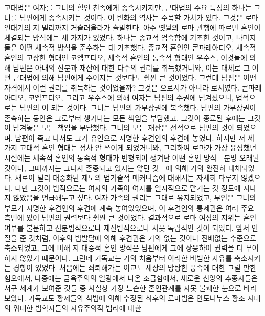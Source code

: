 고대법은 여자를 그녀의 혈연 친족에게 종속시키지만,
근대법의 주요 특징의 하나는 그녀를 남편에게 종속시키는 것이다.
이 변화의 역사는 주목할 가치가 있다.
그것은 로마 연대기의 저 멀리까지 거슬러올라가 출발한다.
아주 옛날의 로마 관행에 따르면
혼인이 체결되는
방식에는
세 가지가
있었다.
하나는 종교적 엄숙함에 기초한 것이고,
나머지 둘은 어떤 세속적 방식을 준수하는 데 기초했다.
종교적 혼인인 콘파레아티오,
세속적 혼인의 고상한 형태인 코엠프티오,
세속적 혼인의 통속적 형태인 우수스,
이것들에 의해 남편은 아내의 신분과 재산에 대한 다수의 권리를 취득했거니와,
이는 대체로 그 어떤 근대법에 의해 남편에게 주어지는 것보다도 훨씬 큰 것이었다.
그런데 남편은 어떤 자격에서 이런 권리를 취득하는 것이었을까?
그것은 으로서가 아니라 로서였다.
콘파레아티오, 코엠프티오, 그리고 우수스에 의해
여자는 남편의 수권에 넘겨졌으니,
법적으로는 남편의 이 되는 것이다.
그녀는 남편의 가부장권에 복속했다.
남편의 가부장권이 존속하는 동안은 그로부터 생겨나는 모든 책임을 부담했고,
그것이 종료된 후에는 그것이 남겨놓은 모든 책임을 부담했다.
그녀의 모든 재산은 전적으로 남편의 것이 되었으며,
남편이 죽고 나서도 그가 유언으로 지명한 후견인의 후견에 놓였다.
하지만
저 세 가지 고대적 혼인 형태는 점차 안 쓰이게 되었거니와,
그리하여 로마가 가장 융성했던 시절에는
세속적 혼인의 통속적 형태가 변형되어 생겨난 어떤 혼인 방식---분명
오래된 것이나, 그때까지는 그다지 존중되고 있지는 않던 것---에 의해
거의 완전히 대체되었다.
새로이 널리 대중화된 제도의 법기술적 메커니즘에 대해서는 자세히 다루지
않겠으나, 다만 그것이 법적으로는
여자의 가족이 여자를 일시적으로 맡기는 것 정도에
지나지 않았음을 언급해두고 싶다.
여자 가족의 권리는 그대로 유지되었고,
부인은 그녀의 부모가 지명한 후견인의 후견에 계속 놓여있었으며,
이 후견인의 통제권은
여러 주요 측면에 있어
남편의 권력보다 훨씬 큰 것이었다.
결과적으로 로마 여성의 지위는
혼인 여부를 불문하고
신분법적으로나 재산법적으로나 사뭇 독립적인 것이 되었다.
앞서 언질을 준 것처럼, 이후의 법발달에 의해
후견권은 거의 없는 것이나 진배없는 수준으로 축소되었고,
그에 비해 저 대중적 혼인 방식은 남편에게 그에 상응하여
권력을 더 부여하지 않았기 때문이다.
그런데 기독교는 거의 처음부터 이러한 비범한 자유를 축소시키는 경향이 있었다.
처음에는 쇠퇴해가는 이교도 세상의 방탕한 풍속에 대한 그럴 만한 혐오에서,
나중에는 금욕주의의 열광에서 나온 조급함에서,
새로운 신앙의 추종자들은 서구 세계가 보여준 것들 중
사실상 가장 느슨한 혼인관계를 자못 불쾌한 눈으로 바라보았다.
기독교도 황제들의 칙법에 의해 수정된 최후의 로마법은
안토니누스 황조 시대의 위대한 법학자들의 자유주의적 법리에 대한
